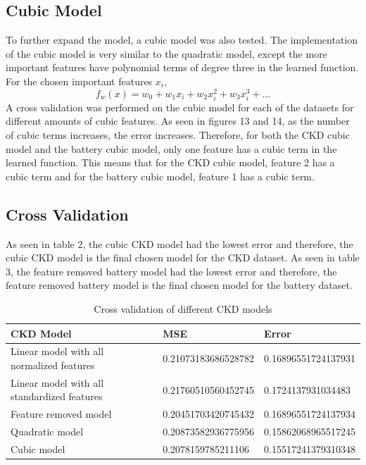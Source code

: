 \documentclass{article}
\begin{document}
\subsection{Cubic Model}

To further expand the model, a cubic model was also tested.   The implementation of the cubic model is very similar to the quadratic model, except the more important features have polynomial terms of degree three in the learned function.  For the chosen important features $x_i$,
\begin{equation}
  f_w (x) = w_0 + w_1 x_i + w_2 x^2_i + w_3 x^3_i + \dots
\end{equation}
A cross validation was performed on the cubic model for each of the datasets for different amounts of cubic features.  
As seen in figures 13 and 14, as the number of cubic terms increases, the error increases.  Therefore, for both the CKD cubic model and the battery cubic model, only one feature has a cubic term in the learned function.  
This means that for the CKD cubic model, feature 2 has a cubic term and for the battery cubic model, feature 1 has a cubic term. 

\subsection{Cross Validation}

As seen in table 2, the cubic CKD model had the lowest error and therefore, the cubic CKD model is the final chosen model for the CKD dataset.  As seen in table 3, the feature removed battery model had the lowest error and therefore, the feature removed battery model is the final chosen model for the battery dataset. 

\begin{table}[h!]
  \centering
  \caption{Cross validation of different CKD models}
  \begin{tabular}{|l|l|l|}
  \hline
  \textbf{CKD Model}                               & \textbf{MSE}                  & \textbf{Error}               \\ \hline
  Linear model with all normalized features        & 0.21073183686528782           & 0.16896551724137931          \\ \hline
  Linear model with all standardized features      & 0.21760510560452745           & 0.1724137931034483           \\ \hline
  Feature removed model                            & 0.20451703420745432           & 0.16896551724137934          \\ \hline
  Quadratic model                                  & 0.20873582936775956           & 0.15862068965517245          \\ \hline
  Cubic model                                      & 0.2078159785211106            & 0.15517241379310348          \\ \hline
  \end{tabular}
\end{table}
\end{document}
